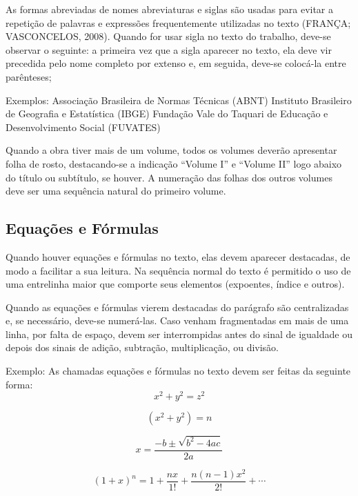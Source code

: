 \documentclass[a4paper,12pt]{article}  %
\begin{document}
\begin{ElementosTextuais}
\begin{Desenvolvimento}
As formas abreviadas de nomes abreviaturas e siglas são usadas para evitar a repetição de palavras e expressões frequentemente utilizadas no texto (FRANÇA; VASCONCELOS, 2008). Quando for usar sigla no texto do trabalho, deve-se observar o seguinte: a primeira vez que a sigla aparecer no texto, ela deve vir precedida pelo nome completo por extenso e, em seguida, deve-se colocá-la entre parênteses;

Exemplos: Associação Brasileira de Normas Técnicas (ABNT)
Instituto Brasileiro de Geografia e Estatística (IBGE)
Fundação Vale do Taquari de Educação e Desenvolvimento Social (FUVATES)

Quando a obra tiver mais de um volume, todos os volumes deverão apresentar folha de rosto, destacando-se a indicação “Volume I” e “Volume II” logo abaixo do título ou subtítulo, se houver. A numeração das folhas dos outros volumes deve ser uma sequência natural do primeiro volume.

\subsection{Equações e Fórmulas}
Quando houver equações e fórmulas no texto, elas devem aparecer destacadas, de modo a facilitar a sua leitura. Na sequência normal do texto é permitido o uso de uma entrelinha maior que comporte seus elementos (expoentes, índice e outros).

Quando as equações e fórmulas vierem destacadas do parágrafo são centralizadas e, se necessário, deve-se numerá-las. Caso venham fragmentadas em mais de uma linha, por falta de espaço, devem ser interrompidas antes do sinal de igualdade ou depois dos sinais de adição, subtração, multiplicação, ou divisão.

Exemplo: As chamadas equações e fórmulas no texto devem ser feitas da seguinte forma:
\begin{equation}
x^2 + y^2 = z^2 \label{eq:pythagoras}
\end{equation}

\begin{equation}
(x^2 + y^2) = n \label{eq:pythagoras2}
\end{equation}

\begin{equation}
x = \frac{-b \pm \sqrt{b^2-4ac}}{2a}
\end{equation}

\begin{equation}
(1 + x)^n = 1 + \frac{nx}{1!} + \frac{n(n-1)x^2}{2!} + \cdots
\end{equation}


\end{Desenvolvimento}
\end{ElementosTextuais}
\end{document}
